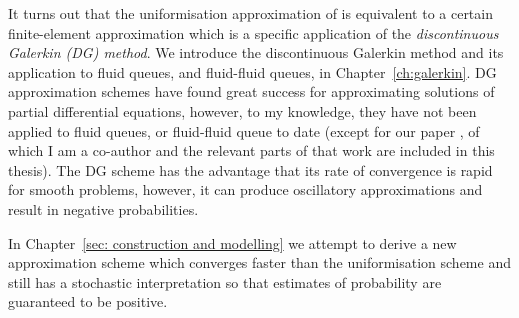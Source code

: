 It turns out that the uniformisation approximation of \cite{bo2013} is equivalent to a certain finite-element approximation which is a specific application of the \emph{discontinuous Galerkin (DG) method}. We introduce the discontinuous Galerkin method and its application to fluid queues, and fluid-fluid queues, in Chapter~\ref{ch:galerkin}. DG approximation schemes have found great success for approximating solutions of partial differential equations, however, to my knowledge, they have not been applied to fluid queues, or fluid-fluid queue to date (except for our paper \cite{blnos2022}, of which I am a co-author and the relevant parts of that work are included in this thesis). The DG scheme has the advantage that its rate of convergence is rapid for smooth problems, however, it can produce oscillatory approximations and result in negative probabilities.

In Chapter~\ref{sec: construction and modelling} we attempt to derive a new approximation scheme which converges faster than the uniformisation scheme and still has a stochastic interpretation so that estimates of probability are guaranteed to be positive.







